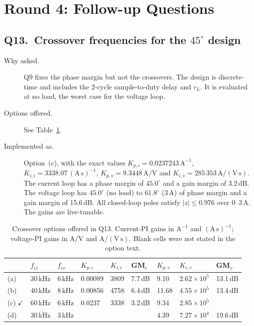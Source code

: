 \documentclass[11pt]{article}
\begin{document}
\section{Round 4: Follow-up Questions}

\subsection*{Q13.\ Crossover frequencies for the $45^\circ$ design}
\begin{description}
\item[Why asked.] Q9 fixes the phase margin but not the crossovers.
The design is discrete-time and includes the 2-cycle
sample-to-duty delay and $r_L$. It is evaluated at no load, the worst
case for the voltage loop.
\item[Options offered.] See Table~\ref{tab:crossover}.
\item[Implemented as.] Option~(c), with the exact values
$K_{p,i}=0.0237243\,\mathrm{A^{-1}}$,
$K_{i,i}=3338.07\,\mathrm{(A\,s)^{-1}}$,
$K_{p,v}=9.3448\,\mathrm{A/V}$ and
$K_{i,v}=285\,353\,\mathrm{A/(V\,s)}$. The current loop has a phase
margin of $45.0^\circ$ and a gain margin of 3.2\,dB. The voltage loop
has $45.0^\circ$ (no load) to $61.8^\circ$ (3\,A) of phase margin and
a gain margin of 15.6\,dB. All closed-loop poles satisfy
$|z|\le 0.976$ over 0--3\,A. The gains are live-tunable.
\end{description}

\begin{table}[H]
\centering
\caption{Crossover options offered in Q13. Current-PI gains in
$\mathrm{A^{-1}}$ and $\mathrm{(A\,s)^{-1}}$; voltage-PI gains in
$\mathrm{A/V}$ and $\mathrm{A/(V\,s)}$. Blank cells were not stated in the option text.}
\label{tab:crossover}
\small
\renewcommand{\arraystretch}{1.25}
\begin{tabular}{@{}lllllllll@{}}
\toprule
 & $f_{ci}$ & $f_{cv}$ & $K_{p,i}$ & $K_{i,i}$ & GM$_i$
 & $K_{p,v}$ & $K_{i,v}$ & GM$_v$ \\
\midrule
(a) & 30\,kHz & 6\,kHz & 0.00089 & 3809 & 7.7\,dB
    & 9.10  & $2.62\times10^{5}$ & 13.1\,dB \\
(b) & 40\,kHz & 8\,kHz & 0.00856 & 4758 & 6.4\,dB
    & 11.68 & $4.55\times10^{5}$ & 13.4\,dB \\
(c)$\;\checkmark$ & 60\,kHz & 6\,kHz & 0.0237 & 3338 & 3.2\,dB
    & 9.34  & $2.85\times10^{5}$ & \\
(d) & 30\,kHz & 3\,kHz & & & & 4.39 & $7.27\times10^{4}$ & 19.6\,dB \\
\bottomrule
\end{tabular}
\end{table}
\end{document}
